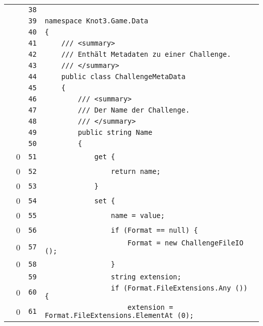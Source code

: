 \documentclass[a4paper,10pt]{article}
\begin{document}
\begin{longtable}[l]{lrrl}
\cellcolor{gray} &  & \verb~38~ & \verb~~\\
\cellcolor{gray} &  & \verb~39~ & \verb~namespace Knot3.Game.Data~\\
\cellcolor{gray} &  & \verb~40~ & \verb~{~\\
\cellcolor{gray} &  & \verb~41~ & \verb~    /// <summary>~\\
\cellcolor{gray} &  & \verb~42~ & \verb~    /// Enthält Metadaten zu einer Challenge.~\\
\cellcolor{gray} &  & \verb~43~ & \verb~    /// </summary>~\\
\cellcolor{gray} &  & \verb~44~ & \verb~    public class ChallengeMetaData~\\
\cellcolor{gray} &  & \verb~45~ & \verb~    {~\\
\cellcolor{gray} &  & \verb~46~ & \verb~        /// <summary>~\\
\cellcolor{gray} &  & \verb~47~ & \verb~        /// Der Name der Challenge.~\\
\cellcolor{gray} &  & \verb~48~ & \verb~        /// </summary>~\\
\cellcolor{gray} &  & \verb~49~ & \verb~        public string Name~\\
\cellcolor{gray} &  & \verb~50~ & \verb~        {~\\
\cellcolor{red} & 0 & \verb~51~ & \verb~            get {~\\
\cellcolor{red} & 0 & \verb~52~ & \verb~                return name;~\\
\cellcolor{red} & 0 & \verb~53~ & \verb~            }~\\
\cellcolor{red} & 0 & \verb~54~ & \verb~            set {~\\
\cellcolor{red} & 0 & \verb~55~ & \verb~                name = value;~\\
\cellcolor{red} & 0 & \verb~56~ & \verb~                if (Format == null) {~\\
\cellcolor{red} & 0 & \verb~57~ & \verb~                    Format = new ChallengeFileIO ();~\\
\cellcolor{red} & 0 & \verb~58~ & \verb~                }~\\
\cellcolor{gray} &  & \verb~59~ & \verb~                string extension;~\\
\cellcolor{red} & 0 & \verb~60~ & \verb~                if (Format.FileExtensions.Any ()) {~\\
\cellcolor{red} & 0 & \verb~61~ & \verb~                    extension = Format.FileExtensions.ElementAt (0);~\\

\end{longtable}
\end{document}
